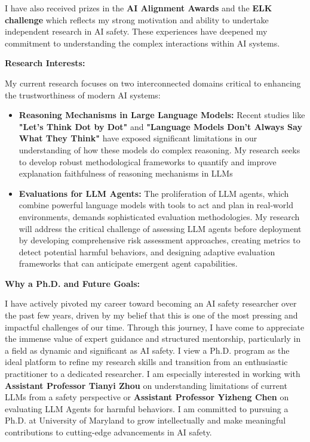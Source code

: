 \documentclass[12pt]{article}
\begin{document}
I have also received prizes in the \textbf{AI Alignment Awards} \cite{alignment_awards} and the \textbf{ELK challenge} which reflects my strong motivation and ability to undertake independent research in AI safety. These experiences have deepened my commitment to understanding the complex interactions within AI systems.

\textbf{Research Interests:}

My current research focuses on two interconnected domains critical to enhancing the trustworthiness of modern AI systems:

\begin{itemize}
    \item \textbf{Reasoning Mechanisms in Large Language Models:} 
    Recent studies like \textbf{"Let's Think Dot by Dot"} \cite{pfau2024} and \textbf{"Language Models Don't Always Say What They Think"} \cite{turpin2023} have exposed significant limitations in our understanding of how these models do complex reasoning. My research seeks to develop robust methodological frameworks to quantify and improve explanation faithfulness of reasoning mechanisms in LLMs
    
    \item \textbf{Evaluations for LLM Agents:}  
    The proliferation of LLM agents, which combine powerful language models with tools to act and plan in real-world environments, demands sophisticated evaluation methodologies. My research will address the critical challenge of assessing LLM agents before deployment by developing comprehensive risk assessment approaches, creating metrics to detect potential harmful behaviors, and designing adaptive evaluation frameworks that can anticipate emergent agent capabilities.
    
\end{itemize}

\newpage
\textbf{Why a Ph.D. and Future Goals:}

I have actively pivoted my career toward becoming an AI safety researcher over the past few years, driven by my belief that this is one of the most pressing and impactful challenges of our time. Through this journey, I have come to appreciate the immense value of expert guidance and structured mentorship, particularly in a field as dynamic and significant as AI safety. I view a Ph.D. program as the ideal platform to refine my research skills and transition from an enthusiastic practitioner to a dedicated researcher. I am especially interested in working with \textbf{Assistant Professor Tianyi Zhou} on understanding limitations of current LLMs from a safety perspective or \textbf{Assistant Professor Yizheng Chen} on evaluating LLM Agents for harmful behaviors. I am committed to pursuing a Ph.D. at University of Maryland to grow intellectually and make meaningful contributions to cutting-edge advancements in AI safety.
\end{document}
